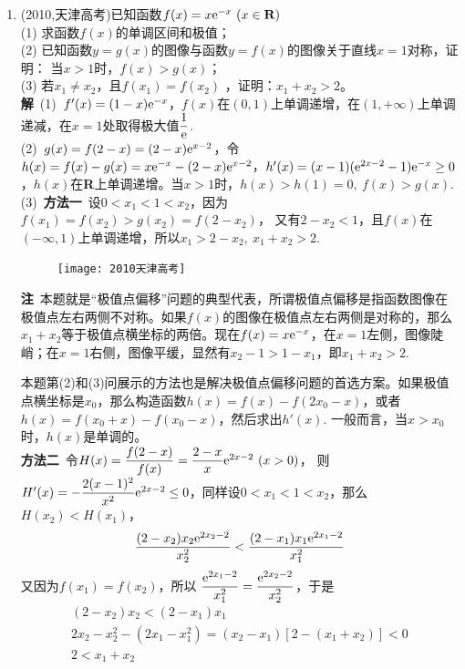 \begin{enumerate}[label={【\textbf{例\thechapter.\arabic*}】},
 leftmargin=\inteval{\myenumleftmargin}pt,
 itemsep=\inteval{\myenumitempsep}pt,
 itemindent=\inteval{\myenumitemindent}pt]
\item (2010,天津高考)已知函数$ f(x)=x\e^{-x}\ (x\in \textbf{R}) $ \\
(1) 求函数$ f(x) $的单调区间和极值；\\
(2) 已知函数$ y=g(x) $的图像与函数$ y=f(x) $的图像关于直线$ x=1 $对称，证明：
当$ x>1 $时，$ f(x)>g(x) $；\\
(3) 若$ x_1\neq x_2 $，且$ f(x_1)=f(x_2) $ ，证明：$ x_1+x_2>2 $。\\
\textbf{解}\ (1)\ $ f'(x)=(1-x)\mathrm{e}^{-x} $，$ f(x) $在$ (0,1) $上单调递增，在$ (1,+\infty) $上单调递减，在$ x=1 $处取得极大值$ \dfrac{1}{\mathrm{e}} $. \\
(2)\ $ g(x)=f(2-x)=(2-x)\mathrm{e}^{x-2} $，令$ h(x)=f(x)-g(x)=x\mathrm{e}^{-x}-(2-x)\mathrm{e}^{x-2} $，$ h'(x)=(x-1)(\mathrm{e}^{2x-2}-1)\mathrm{e}^{-x}\geq 0 $，$ h(x) $在\textbf{R}上单调递增。当$ x>1 $时，$ h(x)>h(1)=0,\ f(x)>g(x) $. \\
(3)\ \textbf{方法一}\ 设$ 0<x_1<1<x_2 $，因为$ f(x_1)=f(x_2)>g(x_2)=f(2-x_2) $，
又有$ 2-x_2<1 $，且$ f(x) $在$ (-\infty,1) $上单调递增，所以$ x_1>2-x_2,\ x_1+x_2>2 $. \\
\begin{figure}[h]
	\centering
	\texttt{[image: 2010天津高考]}
\end{figure}
\textbf{注}\ 本题就是“极值点偏移”问题的典型代表，所谓极值点偏移是指函数图像在极值点左右两侧不对称。如果$ f(x) $的图像在极值点左右两侧是对称的，那么$ x_1+x_2 $等于极值点横坐标的两倍。现在$ f(x)=x\mathrm{e}^{-x} $，在$ x=1 $左侧，图像陡峭；在$ x=1 $右侧，图像平缓，显然有$ x_2-1>1-x_1 $，即$ x_1+x_2>2 $. 

本题第(2)和(3)问展示的方法也是解决极值点偏移问题的首选方案。如果极值点横坐标是$ x_0 $，那么构造函数$ h(x)=f(x)-f(2x_0-x) $，或者$ h(x)=f(x_0+x)-f(x_0-x) $，然后求出$ h'(x) $. 一般而言，当$ x>x_0 $时，$ h(x) $是单调的。\\
\textbf{方法二}\ 令$ H(x)=\dfrac{f(2-x)}{f(x)}=\dfrac{2-x}{x}\e^{2x-2}\ (x>0) $，
则$ H'(x)=-\dfrac{2(x-1)^2}{x^2}\mathrm{e}^{2x-2}\leq 0 $，同样设$ 0<x_1<1<x_2 $，那么$ H(x_2)<H(x_1) $，
\begin{gather*}
	\dfrac{(2-x_2)x_2\mathrm{e}^{2x_2-2}}{x_2^2} <
	\dfrac{(2-x_1)x_1\mathrm{e}^{2x_1-2}}{x_1^2} 
\end{gather*}
又因为$ f(x_1)=f(x_2) $，所以	$ \dfrac{\mathrm{e}^{2x_1-2}}{x_1^2}=\dfrac{\mathrm{e}^{2x_2-2}}{x_2^2} $，于是
\begin{gather*}
    (2-x_2)x_2<(2-x_1)x_1 \\
	2x_2-x_2^2-(2x_1-x_1^2)=(x_2-x_1)[2-(x_1+x_2)]< 0 \\
	2<x_1+x_2
\end{gather*} 


\end{enumerate}
